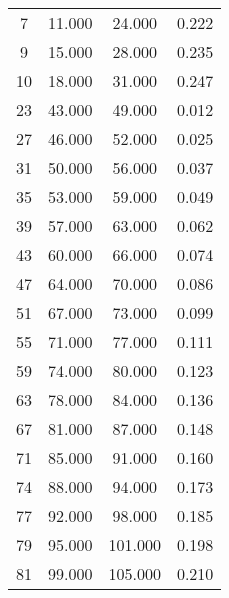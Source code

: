 % 
\begin{tabular}{cccc}
  \hline
  \hline
7 & 11.000 & 24.000 & 0.222 \\ 
  9 & 15.000 & 28.000 & 0.235 \\ 
  10 & 18.000 & 31.000 & 0.247 \\ 
  23 & 43.000 & 49.000 & 0.012 \\ 
  27 & 46.000 & 52.000 & 0.025 \\ 
  31 & 50.000 & 56.000 & 0.037 \\ 
  35 & 53.000 & 59.000 & 0.049 \\ 
  39 & 57.000 & 63.000 & 0.062 \\ 
  43 & 60.000 & 66.000 & 0.074 \\ 
  47 & 64.000 & 70.000 & 0.086 \\ 
  51 & 67.000 & 73.000 & 0.099 \\ 
  55 & 71.000 & 77.000 & 0.111 \\ 
  59 & 74.000 & 80.000 & 0.123 \\ 
  63 & 78.000 & 84.000 & 0.136 \\ 
  67 & 81.000 & 87.000 & 0.148 \\ 
  71 & 85.000 & 91.000 & 0.160 \\ 
  74 & 88.000 & 94.000 & 0.173 \\ 
  77 & 92.000 & 98.000 & 0.185 \\ 
  79 & 95.000 & 101.000 & 0.198 \\ 
  81 & 99.000 & 105.000 & 0.210 \\ 
   \hline
\end{tabular}
